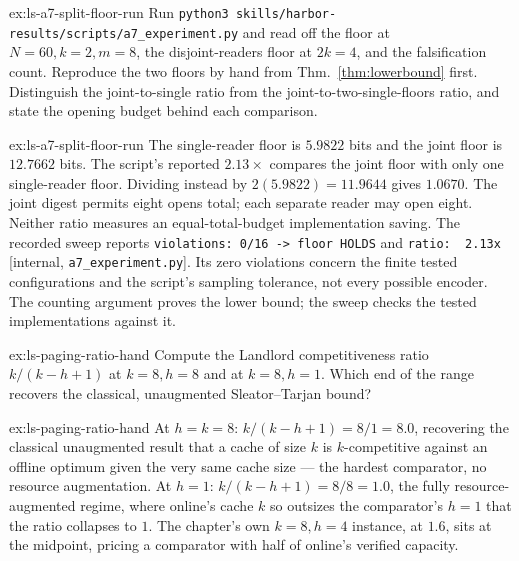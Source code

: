 \documentclass[11pt,a4paper]{article}
\theoremstyle{definition}
\theoremstyle{plain}
\begin{document}
\begin{pdexercise}[kind=Trace,rating=2]{ex:ls-a7-split-floor-run}
Run \texttt{python3 skills/harbor-results/scripts/a7\_experiment.py} and read off the
floor at $N{=}60,k{=}2,m{=}8$, the disjoint-readers floor at $2k{=}4$, and the
falsification count. Reproduce the two floors by hand from Thm.~\ref{thm:lowerbound}
first. Distinguish the joint-to-single ratio from the joint-to-two-single-floors
ratio, and state the opening budget behind each comparison.
\end{pdexercise}
\begin{pdsolution}{ex:ls-a7-split-floor-run}
The single-reader floor is $5.9822$ bits and the joint floor is $12.7662$ bits.
The script's reported $2.13\times$ compares the joint floor with only one
single-reader floor. Dividing instead by $2(5.9822)=11.9644$ gives $1.0670$.
The joint digest permits eight opens total; each separate reader may open
eight. Neither ratio measures an equal-total-budget implementation saving.
The recorded sweep reports \texttt{violations: 0/16 -> floor HOLDS} and
\texttt{ratio:\ \ 2.13x} [internal, \texttt{a7\_experiment.py}]. Its zero
violations concern the finite tested configurations and the script's
sampling tolerance, not every possible encoder. The counting argument
proves the lower bound; the sweep checks the tested implementations against it.
\end{pdsolution}
\begin{pdexercise}[kind=Check,rating=1]{ex:ls-paging-ratio-hand}
Compute the Landlord competitiveness ratio $k/(k-h+1)$ at $k=8,h=8$ and at
$k=8,h=1$. Which end of the range recovers the classical, unaugmented
Sleator--Tarjan bound?
\end{pdexercise}
\begin{pdsolution}{ex:ls-paging-ratio-hand}
At $h=k=8$: $k/(k-h+1)=8/1=8.0$, recovering the classical unaugmented result that a cache of size $k$ is $k$-competitive against an offline optimum given the very same cache size --- the hardest comparator, no resource augmentation. At $h=1$: $k/(k-h+1)=8/8=1.0$, the fully resource-augmented regime, where online's cache $k$ so outsizes the comparator's $h=1$ that the ratio collapses to $1$. The chapter's own $k=8,h=4$ instance, at $1.6$, sits at the midpoint, pricing a comparator with half of online's verified capacity.
\end{pdsolution}

\end{document}
